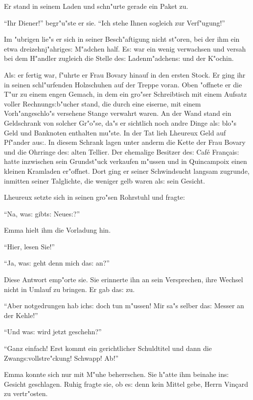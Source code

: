 \documentclass[oneside,12pt]{book}
\newcommand{\s}{s:}%
\begin{document}
Er stand in seinem Laden und schn"urte gerade ein Paket zu.

"`Ihr Diener!"' begr"u"ste er sie. "`Ich stehe Ihnen sogleich zur
Verf"ugung!"'

Im "ubrigen lie"s er sich in seiner Besch"aftigung nicht st"oren,
bei der ihm ein etwa dreizehnj"ahrige{\s} M"adchen half. E{\s} war
ein wenig verwachsen und versah bei dem H"andler zugleich die
Stelle de{\s} Ladenm"adchen{\s} und der K"ochin.

Al{\s} er fertig war, f"uhrte er Frau Bovary hinauf in den ersten
Stock. Er ging ihr in seinen schl"urfenden Holzschuhen auf der
Treppe voran. Oben "offnete er die T"ur zu einem engen Gemach, in
dem ein gro"ser Schreibtisch mit einem Aufsatz voller
Rechnung{\s}b"ucher stand, die durch eine eiserne, mit einem
Vorh"angeschlo"s versehene Stange verwahrt waren. An der Wand
stand ein Geldschrank von solcher Gr"o"se, da"s er sichtlich noch
andre Dinge al{\s} blo"s Geld und Banknoten enthalten mu"ste. In
der Tat lieh Lheureux Geld auf Pf"ander au{\s}. In diesem Schrank
lagen unter anderm die Kette der Frau Bovary und die Ohrringe
de{\s} alten Tellier. Der ehemalige Besitzer de{\s} Caf\'e
Fran\c{c}ai{\s} hatte inzwischen sein Grundst"uck verkaufen
m"ussen und in Quincampoix einen kleinen Kramladen er"offnet. Dort
ging er seiner Schwindsucht langsam zugrunde, inmitten seiner
Talglichte, die weniger gelb waren al{\s} sein Gesicht.

Lheureux setzte sich in seinen gro"sen Rohrstuhl und fragte:

"`Na, wa{\s} gibt{\s} Neue{\s}?"'

Emma hielt ihm die Vorladung hin.

"`Hier, lesen Sie!"'

"`Ja, wa{\s} geht denn mich da{\s} an?"'

Diese Antwort emp"orte sie. Sie erinnerte ihn an sein Versprechen,
ihre Wechsel nicht in Umlauf zu bringen. Er gab da{\s} zu.

"`Aber notgedrungen hab ich{\s} doch tun m"ussen! Mir sa"s selber
da{\s} Messer an der Kehle!"'

"`Und wa{\s} wird jetzt geschehn?"'

"`Ganz einfach! Erst kommt ein gerichtlicher Schuldtitel und dann
die Zwang{\s}\-voll\-stre"ckung! Schwapp! Ab!"'

Emma konnte sich nur mit M"uhe beherrschen. Sie h"atte ihm beinahe
in{\s} Gesicht geschlagen. Ruhig fragte sie, ob e{\s} denn kein
Mittel gebe, Herrn Vin\c{c}ard zu vertr"osten.
\end{document}
